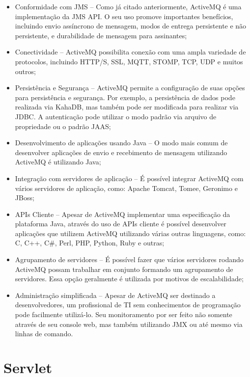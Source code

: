 \begin{itemize}
	\item Conformidade com JMS -- Como já citado anteriormente, ActiveMQ é uma implementação da JMS API. O seu uso promove importantes benefícios, incluindo envio assíncrono de mensagem, modos de entrega persistente e não persistente, e durabilidade de mensagem para assinantes;
	\item Conectividade -- ActiveMQ possibilita conexão com uma ampla variedade de protocolos, incluindo HTTP/S, SSL, MQTT, STOMP, TCP, UDP e muitos outros;
	\item Persistência e Segurança -- ActiveMQ permite a configuração de suas opções para persistência e segurança. Por exemplo, a persistência de dados pode realizada via KahaDB, mas também pode ser modificada para realizar via JDBC. A autenticação pode utilizar o modo padrão via arquivo de propriedade ou o padrão JAAS;
	\item Desenvolvimento de aplicações usando Java -- O modo mais comum de desenvolver aplicações de envio e recebimento de mensagem utilizando ActiveMQ é utilizando Java;
	\item Integração com servidores de aplicação -- É possível integrar ActiveMQ com vários servidores de aplicação, como: Apache Tomcat, Tomee, Geronimo e JBoss;
	\item APIs Cliente -- Apesar de ActiveMQ implementar uma especificação da plataforma Java, através do uso de APIs cliente é possível desenvolver aplicações que utilizem ActiveMQ utilizando várias outras linguagens, como: C, C++, C\#, Perl, PHP, Python, Ruby e outras;
	\item Agrupamento de servidores -- É possível fazer que vários servidores rodando ActiveMQ possam trabalhar em conjunto formando um agrupamento de servidores. Essa opção geralmente é utilizada por motivos de escalabilidade;
	\item Administração simplificada -- Apesar de ActiveMQ ser destinado a desenvolvedores, um profissional de TI sem conhecimentos de programação pode facilmente utilizá-lo. Seu monitoramento por ser feito não somente através de seu console web, mas também utilizando JMX ou até mesmo via linhas de comando.  
\end{itemize}

\section{Servlet}
\label{sec:servlet}

